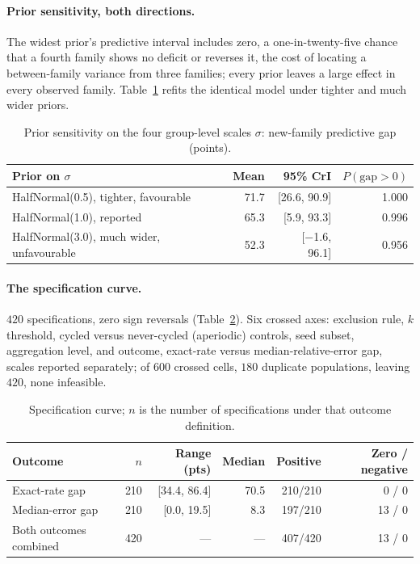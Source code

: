 \paragraph{Prior sensitivity, both directions.} The widest prior's predictive interval includes
zero, a one-in-twenty-five chance that a fourth family shows no deficit or reverses it, the cost
of locating a between-family variance from three families; every prior leaves a large effect in
every observed family. Table~\ref{tab:hier-prior} refits the identical model under tighter and
much wider priors.

\begin{table}[htbp]
\centering
\caption{Prior sensitivity on the four group-level scales $\sigma$: new-family
predictive gap (points).}
\label{tab:hier-prior}
\small
\begin{tabular}{@{}lrrr@{}}
\toprule
Prior on $\sigma$ & Mean & 95\% CrI & $P(\mathrm{gap}>0)$ \\
\midrule
HalfNormal(0.5), tighter, favourable & 71.7 & [26.6, 90.9] & 1.000 \\
HalfNormal(1.0), reported & 65.3 & [5.9, 93.3] & 0.996 \\
HalfNormal(3.0), much wider, unfavourable & 52.3 & [$-$1.6, 96.1] & 0.956 \\
\bottomrule
\end{tabular}
\end{table}

\paragraph{The specification curve.} $420$ specifications, zero sign reversals
(Table~\ref{tab:hier-spec}). Six crossed axes: exclusion rule, $k$ threshold, cycled versus
never-cycled (aperiodic) controls, seed subset, aggregation level, and outcome, exact-rate
versus median-relative-error gap, scales reported separately; of $600$ crossed cells, $180$
duplicate populations, leaving $420$, none infeasible.

\begin{table}[htbp]
\centering
\caption{Specification curve; $n$ is the number of specifications under that
outcome definition.}
\label{tab:hier-spec}
\small
\begin{tabular}{@{}lrrrrr@{}}
\toprule
Outcome & $n$ & Range (pts) & Median & Positive & Zero / negative \\
\midrule
Exact-rate gap & 210 & [34.4, 86.4] & 70.5 & 210/210 & 0 / 0 \\
Median-error gap & 210 & [0.0, 19.5] & 8.3 & 197/210 & 13 / 0 \\
\midrule
Both outcomes combined & 420 & --- & --- & 407/420 & 13 / 0 \\
\bottomrule
\end{tabular}
\end{table}

